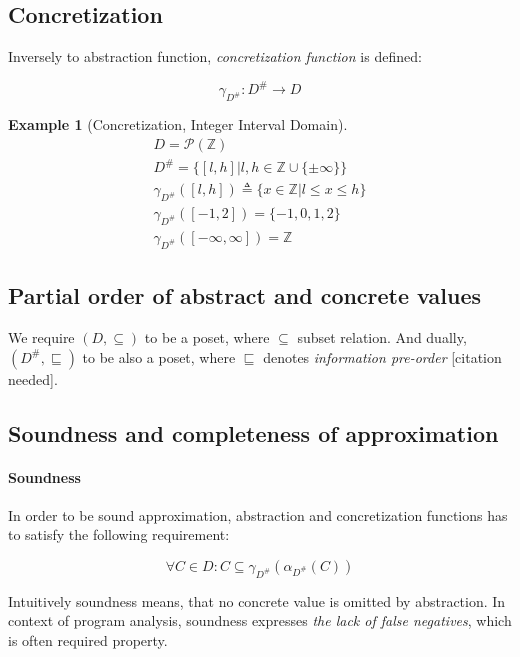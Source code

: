 \documentclass[12pt,oneside]{fithesis2}
\theoremstyle{definition}
\newtheorem{exmp}{Example}[section]
\begin{document}
\subsection{Concretization}
Inversely to abstraction function, \textit{concretization function} is defined: \cite{CousotCousot76-1}

\[
\gamma_{D^\#}\colon D^\# \to D
\]

\begin{exmp}[Concretization, Integer Interval Domain\cite{mine-WING12}]
  \begin{gather*}
    D = \mathcal P(\mathbb Z)\\
    D^\# = \{[l,h] | l,h \in \mathbb{Z} \cup \{\pm\infty\}\}\\
    \gamma_{D^\#}([l,h]) \triangleq \{x \in \mathbb Z | l \le x \le h\}\\
    \gamma_{D^\#}([-1,2]) = \{-1, 0, 1, 2\}\\
    \gamma_{D^\#}([-\infty, \infty]) = \mathbb Z
  \end{gather*}
\end{exmp}

\subsection{Partial order of abstract and concrete values}

We require $(D, \subseteq)$ to be a poset, where $\subseteq$ subset relation. And dually, $(D^\#, \sqsubseteq)$ to be also a poset, where $\sqsubseteq$ denotes \textit{information pre-order} [citation needed].

\subsection{Soundness and completeness of approximation}

\paragraph{Soundness}
In order to be sound approximation, abstraction and concretization functions has to satisfy the following requirement: \cite{mine-AIAA10}

\[
  \forall C \in D: C \subseteq \gamma_{D^\#}(\alpha_{D^\#}(C))
\]

Intuitively soundness means, that no concrete value is omitted by abstraction. In context of program analysis, soundness expresses \textit{the lack of false negatives}, which is often required property.
\end{document}
